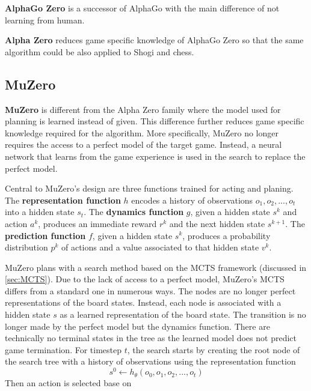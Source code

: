 \documentclass[12pt]{article}
\newcommand{\note}[1]{\todo[color=yellow!40,bordercolor=none,linecolor=black]{#1}}
\begin{document}
\textbf{AlphaGo Zero} is a successor of AlphaGo with the main difference of not learning from human.

\textbf{Alpha Zero} reduces game specific knowledge of AlphaGo Zero so that the same algorithm could be also applied to Shogi and chess.


\subsection{MuZero}
\textbf{MuZero} is different from the Alpha Zero family where the model used for planning is learned instead of given.
This difference further reduces game specific knowledge required for the algorithm.
More specifically, MuZero no longer requires the access to a perfect model of the target game.
Instead, a neural network that learns from the game experience is used in the search to replace the perfect model.

Central to MuZero's design are three functions trained for acting and planing.
The \textbf{representation function} $h$ encodes a history of observations $o_1, o_2, ..., o_t$ into a hidden state $s_t$.
The \textbf{dynamics function} $g$, given a hidden state $s^k$ and action $a^k$, produces an immediate reward $r^k$ and the next hidden state $s^{k+1}$.
The \textbf{prediction function} $f$, given a hidden state $s^k$, produces a probability distribution $p^k$ of actions and a value associated to that hidden state $v^k$.

MuZero plans with a search method based on the MCTS framework (discussed in \ref{sec:MCTS}).
Due to the lack of access to a perfect model, MuZero's MCTS differs from a standard one in numerous ways.
The nodes are no longer perfect representations of the board states.
Instead, each node is associated with a hidden state $s$ as a learned representation of the board state.
The transition is no longer made by the perfect model but the dynamics function.
There are technically no terminal states in the tree as the learned model does not predict game termination.
For timestep $t$, the search starts by creating the root node of the search tree with a history of observations
using the representation function
\begin{equation*}
    s^0 \leftarrow h_{\theta}(o_0, o_1, o_2, ..., o_t)
\end{equation*}
Then an action is selected base on

\end{document}
